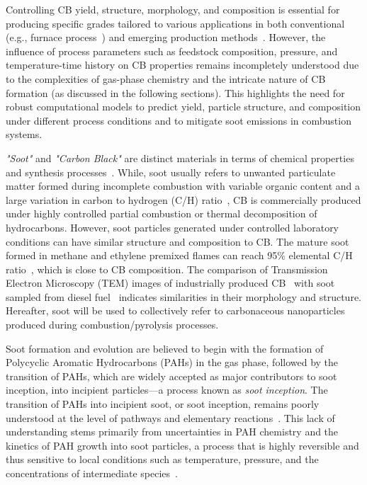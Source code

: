 Controlling CB yield, structure, morphology, and composition is essential for producing specific grades tailored to various applications in both conventional (e.g., furnace process~\citep{dames2023plasma}) and emerging production methods~\citep{li2017experimental, fulcheri2023energy, patlolla2023review}. However, the influence of process parameters such as feedstock composition, pressure, and temperature-time history on CB properties remains incompletely understood due to the complexities of gas-phase chemistry and the intricate nature of CB formation (as discussed in the following sections). This highlights the need for robust computational models to predict yield, particle structure, and composition under different process conditions and to mitigate soot emissions in combustion systems.

\textit{"Soot"} and \textit{"Carbon Black"} are distinct materials in terms of chemical properties and synthesis processes~\cite{watson2001carbon}. While, soot usually refers to unwanted particulate matter formed during incomplete combustion with variable organic content and a large variation in carbon to hydrogen (C/H) ratio~\citep{watson2001carbon}, CB is commercially produced under highly controlled partial combustion or thermal decomposition of hydrocarbons. However, soot particles generated under controlled laboratory conditions can have similar structure and composition to CB. The mature soot formed in methane and ethylene premixed flames can reach 95\% elemental C/H ratio~\cite{russo2015dehydrogenation}, which is close to CB composition. The comparison of Transmission Electron Microscopy (TEM) images of industrially produced CB~\citep{singh2018nanostructure} with soot sampled from diesel fuel~\citep{vander2007hrtem, lapuerta2017morphological} indicates similarities in their morphology and structure. Hereafter, soot will be used to collectively refer to carbonaceous nanoparticles produced during combustion/pyrolysis processes.

Soot formation and evolution are believed to begin with the formation of Polycyclic Aromatic Hydrocarbons (PAHs) in the gas phase, followed by the transition of PAHs, which are widely accepted as major contributors to soot inception, into incipient particles—a process known as \textit{soot inception}.
The transition of PAHs into incipient soot, or soot inception, remains poorly understood at the level of pathways and elementary reactions~\citep{Wang2011}. This lack of understanding stems primarily from uncertainties in PAH chemistry and the kinetics of PAH growth into soot particles, a process that is highly reversible and thus sensitive to local conditions such as temperature, pressure, and the concentrations of intermediate species~\citep{Wang2011}.

